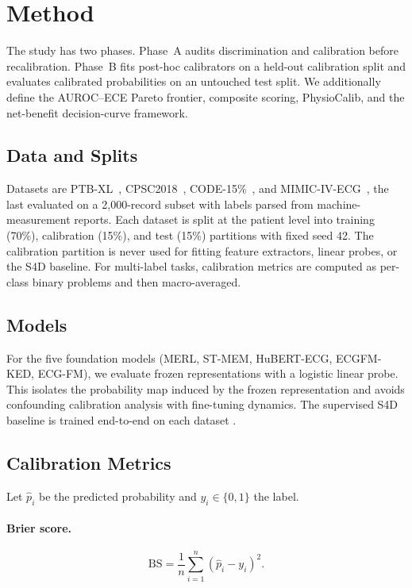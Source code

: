 \section{Method}
\label{sec:method}

The study has two phases. Phase~A audits discrimination and calibration before recalibration.
Phase~B fits post-hoc calibrators on a held-out calibration split and evaluates calibrated
probabilities on an untouched test split. We additionally define the AUROC--ECE Pareto
frontier, composite scoring, PhysioCalib, and the net-benefit decision-curve framework.

\subsection{Data and Splits}

Datasets are PTB-XL~\citep{strodthoff2020ptbxl},
CPSC2018~\citep{cpsc2018}, CODE-15\%~\citep{ribeiro2021code15}, and
MIMIC-IV-ECG~\citep{mimicivecg2023}, the last evaluated on a 2{,}000-record subset with
labels parsed from machine-measurement reports.
Each dataset is split at the patient level into training (70\%), calibration (15\%), and test
(15\%) partitions with fixed seed 42. The calibration partition is never used for fitting
feature extractors, linear probes, or the S4D baseline. For multi-label tasks, calibration
metrics are computed as per-class binary problems and then macro-averaged.

\subsection{Models}

For the five foundation models (MERL, ST-MEM, HuBERT-ECG, ECGFM-KED, ECG-FM), we evaluate
frozen representations with a logistic linear probe. This isolates the probability map
induced by the frozen representation and avoids confounding calibration analysis with
fine-tuning dynamics. The supervised S4D baseline is trained end-to-end on each dataset
\citep{gu2022s4ecg, s4d2024ecg}.

\subsection{Calibration Metrics}
\label{sec:metrics}

Let $\hat{p}_i$ be the predicted probability and $y_i \in \{0,1\}$ the label.

\paragraph{Brier score.}
\[
  \mathrm{BS} = \frac{1}{n}\sum_{i=1}^n(\hat{p}_i - y_i)^2.
\]

